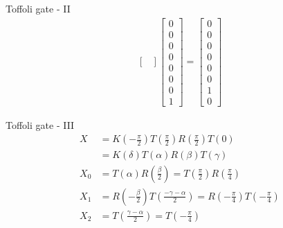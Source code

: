 \documentclass{beamer}
\begin{document}
\begin{frame}{Toffoli gate - II}
{\begin{align*}
\begin{bmatrix}
      \end{bmatrix}
      \begin{bmatrix} 
        0 \\ 0 \\ 0 \\ 0 \\ 0 \\ 0 \\ 0 \\ 1
      \end{bmatrix} 
      =
      \begin{bmatrix} 
        0 \\ 0 \\ 0 \\ 0 \\ 0 \\ 0 \\ 1 \\ 0
      \end{bmatrix} 
    \end{align*}
  }%
\end{frame}

\begin{frame}{Toffoli gate - III}
  {\tiny
    \begin{align*}
      X &= K(-\frac{\pi}{2}) T(\frac{\pi}{2}) R(\frac{\pi}{2}) T(0) \\
        &= K(\delta)T(\alpha)R(\beta)T(\gamma) \\
      X_0 &= T(\alpha)R(\frac{\beta}{2}) = T(\frac{\pi}{2})R(\frac{\pi}{4}) \\
      X_1 &= R(-\frac{\beta}{2})T(\frac{-\gamma - \alpha}{2}) = R(-\frac{\pi}{4})T(-\frac{\pi}{4}) \\
      X_2 &= T(\frac{\gamma - \alpha}{2}) = T(-\frac{\pi}{4})
    \end{align*}
  }%
\end{frame}
\end{document}
